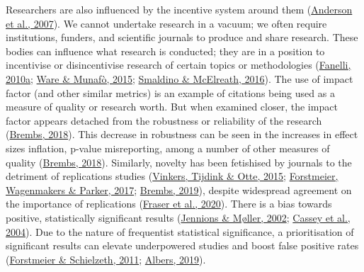\documentclass[10pt,a4paper]{article}
\begin{document}
Researchers are also influenced by the incentive system around them (\protect\hyperlink{ref-anderson_perverse_2007}{Anderson et al., 2007}).
We cannot undertake research in a vacuum; we often require institutions, funders, and scientific journals to produce and share research.
These bodies can influence what research is conducted; they are in a position to incentivise or disincentivise research of certain topics or methodologies (\protect\hyperlink{ref-fanelli_pressures_2010}{Fanelli, 2010a}; \protect\hyperlink{ref-ware_significance_2015}{Ware \& Munafò, 2015}; \protect\hyperlink{ref-smaldino_natural_2016}{Smaldino \& McElreath, 2016}).
The use of impact factor (and other similar metrics) is an example of citations being used as a measure of quality or research worth.
But when examined closer, the impact factor appears detached from the robustness or reliability of the research (\protect\hyperlink{ref-Brembs2018}{Brembs, 2018}).
This decrease in robustness can be seen in the increases in effect sizes inflation, p-value misreporting, among a number of other measures of quality (\protect\hyperlink{ref-Brembs2018}{Brembs, 2018}).
Similarly, novelty has been fetishised by journals to the detriment of replications studies (\protect\hyperlink{ref-vinkers_use_2015}{Vinkers, Tijdink \& Otte, 2015}; \protect\hyperlink{ref-forstmeier_detecting_2017}{Forstmeier, Wagenmakers \& Parker, 2017}; \protect\hyperlink{ref-brembs_reliable_2019}{Brembs, 2019}), despite widespread agreement on the importance of replications (\protect\hyperlink{ref-fraser_role_2020}{Fraser et al., 2020}).
There is a bias towards positive, statistically significant results (\protect\hyperlink{ref-jennions_publication_2002}{Jennions \& Møller, 2002}; \protect\hyperlink{ref-cassey_survey_2004}{Cassey et al., 2004}).
Due to the nature of frequentist statistical significance, a prioritisation of significant results can elevate underpowered studies and boost false positive rates (\protect\hyperlink{ref-forstmeier_cryptic_2011}{Forstmeier \& Schielzeth, 2011}; \protect\hyperlink{ref-albers_problem_2019}{Albers, 2019}).
\end{document}
